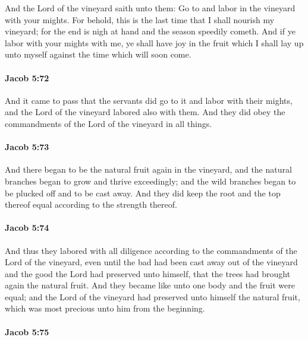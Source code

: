 			And the Lord of the vineyard saith unto them:
			Go to and labor in the vineyard with your mights.
			For behold, this is the last time that I shall nourish my vineyard;
			for the end is nigh at hand and the season speedily cometh.
			And if ye labor with your mights with me, ye shall have joy in the fruit
			which I shall lay up unto myself against the time which will soon come.

		\paragraph{Jacob 5:72} %
			\label{JACOB-5-72}

			And it came to pass that the servants did go to it and labor with their mights,
			and the Lord of the vineyard labored also with them.
			And they did obey the commandments of the Lord of the vineyard in all things.

		\paragraph{Jacob 5:73} %
			\label{JACOB-5-73}

			And there began to be the natural fruit again in the vineyard,
			and the natural branches began to grow and thrive exceedingly;
			and the wild branches began to be plucked off and to be cast away.
			And they did keep the root and the top thereof equal
			according to the strength thereof.

		\paragraph{Jacob 5:74} %
			\label{JACOB-5-74}

			And thus they labored with all diligence
			according to the commandments of the Lord of the vineyard,
			even until the bad had been cast away out of the vineyard
			and the good the Lord had preserved unto himself,
			that the trees had brought again the natural fruit.
			And they became like unto one body and the fruit were equal;
			and the Lord of the vineyard had preserved unto himself the natural fruit,
			which was most precious unto him from the beginning.

		\paragraph{Jacob 5:75} %
			\label{JACOB-5-75}

